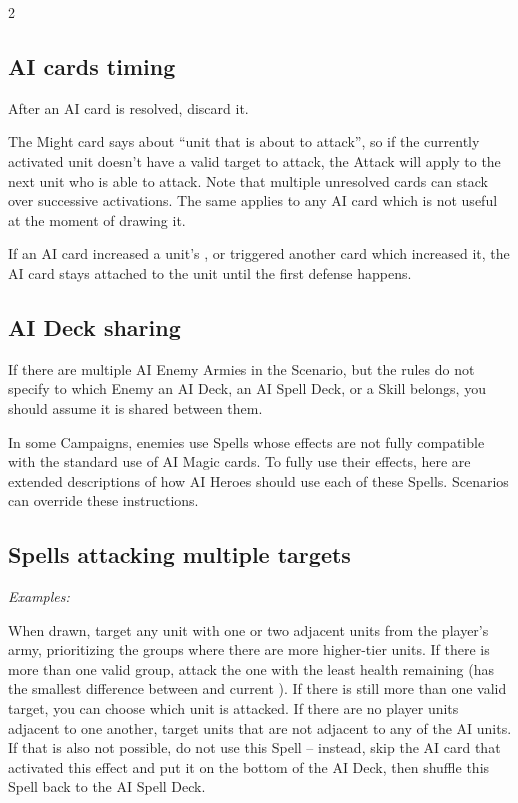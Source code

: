 \begin{multicols*}{2}
  \subsection*{AI cards timing}
  After an AI card is resolved, discard it.

  The  Might  card says about ``unit that is about to attack'', so if the currently activated unit doesn't have a valid target to attack, the Attack will apply to the next unit who is able to attack.
  Note that multiple unresolved cards can stack over successive activations.
  The same applies to any AI card which is not useful at the moment of drawing it.

  If an AI card increased a unit's , or triggered another card which increased it, the AI card stays attached to the unit until the first defense happens.

  \subsection*{AI Deck sharing}
  If there are multiple AI Enemy Armies in the Scenario, but the rules do not specify to which Enemy an AI Deck, an AI Spell Deck, or a Skill belongs, you should assume it is shared between them.

  \bigskip
  \bigskip
  In some Campaigns, enemies use Spells whose effects are not fully compatible with the standard use of AI Magic  cards.
  To fully use their effects, here are extended descriptions of how AI Heroes should use each of these Spells.
  Scenarios can override these instructions.

  \subsection*{Spells attacking multiple targets}
  \textit{Examples:  }

  When drawn, target any unit with one or two adjacent units from the player's army, prioritizing the groups where there are more higher-tier units.
  If there is more than one valid group, attack the one with the least health remaining (has the smallest difference between  and current ).
  If there is still more than one valid target, you can choose which unit is attacked.
  If there are no player units adjacent to one another, target units that are not adjacent to any of the AI units.
  If that is also not possible, do not use this Spell -- instead, skip the AI  card that activated this effect and put it on the bottom of the AI Deck, then shuffle this Spell back to the AI Spell Deck.


\end{multicols*}
